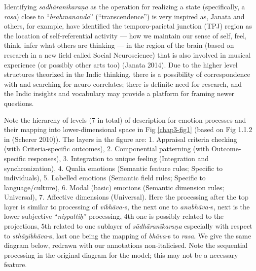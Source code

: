 Identifying \textsl{sadhāranīkaraṇa} as the operation for realizing a state (specifically, a \textsl{rasa}) close to “\textsl{brahmānanda}” (“transcendence”) is very inspired as, Janata and others, for example, have identified the temporo-parietal junction (TPJ) region as the location of self-referential activity — how we maintain our sense of self, feel, think, infer what others are thinking --- in the region of the brain (based on research in a new field called Social Neuroscience) that is also involved in musical experience (or possibly other arts too) (Janata 2014). Due to the higher level structures theorized in the Indic thinking, there is a possibility of correspondence with and searching for neuro-correlates; there is definite need for research, and the Indic insights and vocabulary may provide a platform for framing newer questions.

Note the hierarchy of levels (7 in total) of description for emotion processes and their mapping into lower-dimensional space in Fig \ref{chap3-fig1} (based on Fig 1.1.2 in (Scherer 2010)). The layers in the figure are: 1. Appraisal criteria checking (with Criteria-specific outcomes), 2. Componential patterning (with Outcome-specific responses), 3. Integration to unique feeling (Integration and synchronization), 4. Qualia emotions (Semantic feature rules; Specific to individuals), 5. Labelled emotions (Semantic field rules; Specific to language/culture), 6. Modal (basic) emotions (Semantic dimension rules; Universal), 7. Affective dimensions (Universal). Here the processing after the top layer is similar to processing of \textsl{vibhāva-}s, the next one to \textsl{anubhāva-}s, next is the lower subjective “\textsl{niṣpattiḥ}” processing, 4th one is possibly related to the projections, 5th related to one sublayer of \textsl{sādhāranīkaraṇa} especially with respect to \textsl{sthāyibhāva}-s, last one being the mapping of \textsl{bhāva}-s to \textsl{rasa}. We give the same diagram below, redrawn with our annotations non-italicised. Note the sequential processing in the original diagram for the model; this may not be a necessary feature. 

